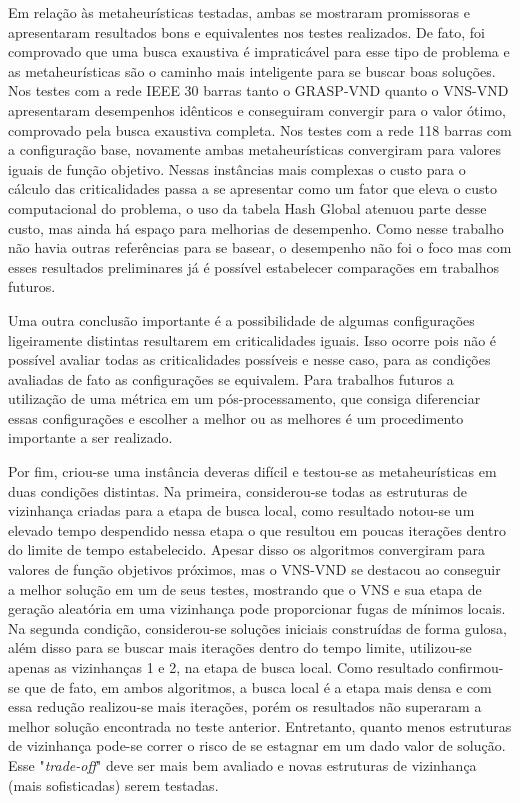 \documentclass[12pt]{article}
\begin{document}
Em relação às metaheurísticas testadas, ambas se mostraram promissoras e apresentaram resultados bons e equivalentes nos testes realizados. De fato, foi comprovado que uma busca exaustiva é impraticável para esse tipo de problema e as metaheurísticas são o caminho mais inteligente para se buscar boas soluções. Nos testes com a rede IEEE 30 barras tanto o GRASP-VND quanto o VNS-VND apresentaram desempenhos idênticos e conseguiram convergir para o valor ótimo, comprovado pela busca exaustiva completa. Nos testes com a rede 118 barras com a configuração base, novamente ambas metaheurísticas convergiram para valores iguais de função objetivo. Nessas instâncias mais complexas o custo para o cálculo das criticalidades passa a se apresentar como um fator que eleva o custo computacional do problema, o uso da tabela Hash Global atenuou parte desse custo, mas ainda há espaço para melhorias de desempenho. Como nesse trabalho não havia outras referências para se basear, o desempenho não foi o foco mas com esses resultados preliminares já é possível estabelecer comparações em trabalhos futuros.

Uma outra conclusão importante é a possibilidade de algumas configurações ligeiramente distintas resultarem em criticalidades iguais. Isso ocorre pois não é possível avaliar todas as criticalidades possíveis e nesse caso, para as condições avaliadas de fato as configurações se equivalem. Para trabalhos futuros a utilização de uma métrica em um pós-processamento, que consiga diferenciar essas configurações e escolher a melhor ou as melhores é um procedimento importante a ser realizado.

Por fim, criou-se uma instância deveras difícil e testou-se as metaheurísticas em duas condições distintas. Na primeira, considerou-se todas as estruturas de vizinhança criadas para a etapa de busca local, como resultado notou-se um elevado tempo despendido nessa etapa o que resultou em poucas iterações dentro do limite de tempo estabelecido. Apesar disso os algoritmos convergiram para valores de função objetivos próximos, mas o VNS-VND se destacou ao conseguir a melhor solução em um de seus testes, mostrando que o VNS e sua etapa de geração aleatória em uma vizinhança pode proporcionar fugas de mínimos locais. Na segunda condição, considerou-se soluções iniciais construídas de forma gulosa, além disso para se buscar mais iterações dentro do tempo limite, utilizou-se apenas as vizinhanças 1 e 2, na etapa de busca local. Como resultado confirmou-se que de fato, em ambos algoritmos, a busca local é a etapa mais densa e com essa redução realizou-se mais iterações, porém os resultados não superaram a melhor solução encontrada no teste anterior. Entretanto, quanto menos estruturas de vizinhança pode-se correr o risco de se estagnar em um dado valor de solução. Esse "\textit{trade-off}" deve ser mais bem avaliado e novas estruturas de vizinhança (mais sofisticadas) serem testadas.
\end{document}
